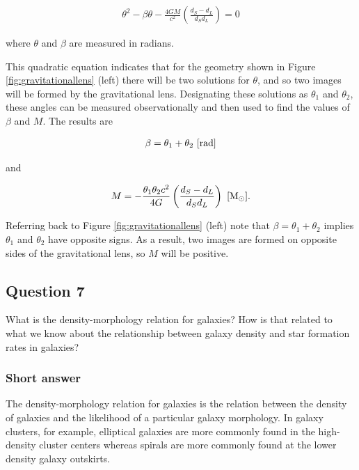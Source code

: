 \documentclass[a4paper,10pt]{article}
\begin{document}
\begin{align*}
    \theta^2 - \beta\theta - \frac{4GM}{c^2} \left(\frac{d_S-d_L}{d_Sd_L}\right) = 0
\end{align*}

{\noindent}where $\theta$ and $\beta$ are measured in radians.

{\noindent}This quadratic equation indicates that for the geometry shown in Figure \ref{fig:gravitationallens} (left) there will be two solutions for $\theta$, and so two images will be formed by the gravitational lens. Designating these solutions as $\theta_1$ and $\theta_2$, these angles can be measured observationally and then used to find the values of $\beta$ and $M$. The results are

\begin{align*}
    \beta = \theta_1 + \theta_2 ~ [{\rm rad}]
\end{align*}

{\noindent}and

\begin{align*}
    M = -\frac{\theta_1\theta_2c^2}{4G} \left(\frac{d_S-d_L}{d_Sd_L}\right) ~ [{\rm M_\odot}].
\end{align*}

{\noindent}Referring back to Figure \ref{fig:gravitationallens} (left) note that $\beta=\theta_1+\theta_2$ implies $\theta_1$ and $\theta_2$ have opposite signs. As a result, two images are formed on opposite sides of the gravitational lens, so $M$ will be positive.


\newpage
\subsection{Question 7}

What is the density-morphology relation for galaxies? How is that related to what we know about the relationship between galaxy density and star formation rates in galaxies?

\subsubsection{Short answer}

The density-morphology relation for galaxies is the relation between the density of galaxies and the likelihood of a particular galaxy morphology. In galaxy clusters, for example, elliptical galaxies are more commonly found in the high-density cluster centers whereas spirals are more commonly found at the lower density galaxy outskirts.
\end{document}
